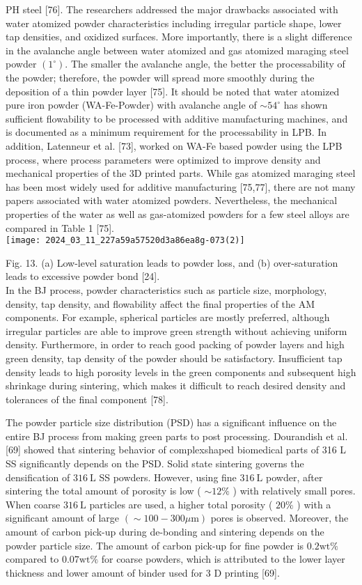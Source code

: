 \documentclass[10pt]{article}
\begin{document}
PH steel [76]. The researchers addressed the major drawbacks associated with water atomized powder characteristics including irregular particle shape, lower tap densities, and oxidized surfaces. More importantly, there is a slight difference in the avalanche angle between water atomized and gas atomized maraging steel powder $\left(1^{\circ}\right)$. The smaller the avalanche angle, the better the processability of the powder; therefore, the powder will spread more smoothly during the deposition of a thin powder layer [75]. It should be noted that water atomized pure iron powder (WA-Fe-Powder) with avalanche angle of $\sim 54^{\circ}$ has shown sufficient flowability to be processed with additive manufacturing machines, and is documented as a minimum requirement for the processability in LPB. In addition, Latenneur et al. [73], worked on WA-Fe based powder using the LPB process, where process parameters were optimized to improve density and mechanical properties of the 3D printed parts. While gas atomized maraging steel has been most widely used for additive manufacturing [75,77], there are not many papers associated with water atomized powders. Nevertheless, the mechanical properties of the water as well as gas-atomized powders for a few steel alloys are compared in Table 1 [75].\\
\texttt{[image: 2024\_03\_11\_227a59a57520d3a86ea8g-073(2)]}

Fig. 13. (a) Low-level saturation leads to powder loss, and (b) over-saturation leads to excessive powder bond [24].\\
In the BJ process, powder characteristics such as particle size, morphology, density, tap density, and flowability affect the final properties of the AM components. For example, spherical particles are mostly preferred, although irregular particles are able to improve green strength without achieving uniform density. Furthermore, in order to reach good packing of powder layers and high green density, tap density of the powder should be satisfactory. Insufficient tap density leads to high porosity levels in the green components and subsequent high shrinkage during sintering, which makes it difficult to reach desired density and tolerances of the final component [78].

The powder particle size distribution (PSD) has a significant influence on the entire BJ process from making green parts to post processing. Dourandish et al. [69] showed that sintering behavior of complexshaped biomedical parts of 316 L SS significantly depends on the PSD. Solid state sintering governs the densification of $316 \mathrm{~L}$ SS powders. However, using fine $316 \mathrm{~L}$ powder, after sintering the total amount of porosity is low ( $\sim 12 \%$ ) with relatively small pores. When coarse $316 \mathrm{~L}$ particles are used, a higher total porosity ( $20 \%$ ) with a significant amount of large $(\sim 100-300 \mu \mathrm{m})$ pores is observed. Moreover, the amount of carbon pick-up during de-bonding and sintering depends on the powder particle size. The amount of carbon pick-up for fine powder is $0.2 \mathrm{wt} \%$ compared to $0.07 \mathrm{wt} \%$ for coarse powders, which is attributed to the lower layer thickness and lower amount of binder used for 3 D printing [69].
\end{document}
